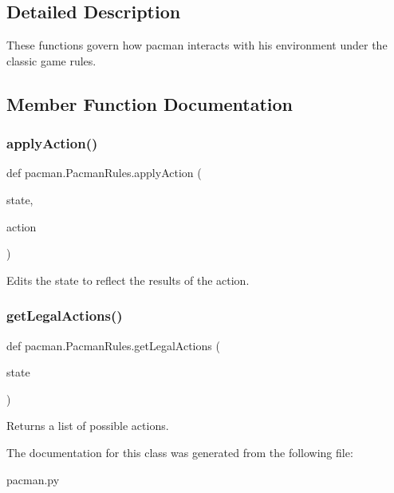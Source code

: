 \subsection{Detailed Description}
\begin{DoxyVerb}These functions govern how pacman interacts with his environment under
the classic game rules.
\end{DoxyVerb}
 

\subsection{Member Function Documentation}
\mbox{\label{classpacman_1_1_pacman_rules_a8ba8b14554cc3631ad7ff93c973ba072}} 
\subsubsection{\texorpdfstring{apply\+Action()}{applyAction()}}
{\footnotesize\ttfamily def pacman.\+Pacman\+Rules.\+apply\+Action (\begin{DoxyParamCaption}\item[{}]{state,  }\item[{}]{action }\end{DoxyParamCaption})}

\begin{DoxyVerb}Edits the state to reflect the results of the action.
\end{DoxyVerb}
 \mbox{\label{classpacman_1_1_pacman_rules_a515c73c403fdb8e7512bb9c587249477}} 
\subsubsection{\texorpdfstring{get\+Legal\+Actions()}{getLegalActions()}}
{\footnotesize\ttfamily def pacman.\+Pacman\+Rules.\+get\+Legal\+Actions (\begin{DoxyParamCaption}\item[{}]{state }\end{DoxyParamCaption})}

\begin{DoxyVerb}Returns a list of possible actions.
\end{DoxyVerb}
 

The documentation for this class was generated from the following file\+:\begin{DoxyCompactItemize}
\item 
pacman.\+py\end{DoxyCompactItemize}
